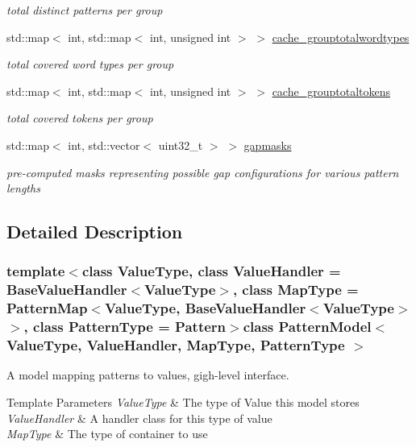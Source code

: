 \begin{DoxyCompactItemize}
\begin{DoxyCompactList}\small\item\em total distinct patterns per group \end{DoxyCompactList}\item 
std\+::map$<$ int, std\+::map$<$ int, unsigned int $>$ $>$ \hyperlink{classPatternModel_aa1055f5f99d2abb04c7a0bcc8b0dbc5b}{cache\+\_\+grouptotalwordtypes}
\begin{DoxyCompactList}\small\item\em total covered word types per group \end{DoxyCompactList}\item 
std\+::map$<$ int, std\+::map$<$ int, unsigned int $>$ $>$ \hyperlink{classPatternModel_a3b1718a6e2a3d0e2aa328fc18b3f2527}{cache\+\_\+grouptotaltokens}
\begin{DoxyCompactList}\small\item\em total covered tokens per group \end{DoxyCompactList}\item 
std\+::map$<$ int, std\+::vector$<$ uint32\+\_\+t $>$ $>$ \hyperlink{classPatternModel_a6136c80df09f3721420f97606c6412b6}{gapmasks}
\begin{DoxyCompactList}\small\item\em pre-\/computed masks representing possible gap configurations for various pattern lengths \end{DoxyCompactList}\end{DoxyCompactItemize}


\subsection{Detailed Description}
\subsubsection*{template$<$class Value\+Type, class Value\+Handler = Base\+Value\+Handler$<$\+Value\+Type$>$, class Map\+Type = Pattern\+Map$<$\+Value\+Type, Base\+Value\+Handler$<$\+Value\+Type$>$$>$, class Pattern\+Type = Pattern$>$class Pattern\+Model$<$ Value\+Type, Value\+Handler, Map\+Type, Pattern\+Type $>$}

A model mapping patterns to values, gigh-\/level interface. 


\begin{DoxyTemplParams}{Template Parameters}
{\em Value\+Type} & The type of Value this model stores \\
\hline
{\em Value\+Handler} & A handler class for this type of value \\
\hline
{\em Map\+Type} & The type of container to use \\
\hline
\end{DoxyTemplParams}


